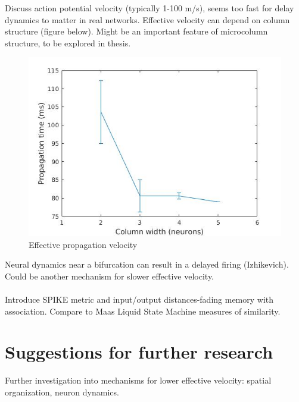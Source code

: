 \documentclass[a4paper,11pt]{article}
\numberwithin{equation}{section}
\begin{document}
Discuss action potential velocity (typically 1-100 m/s), seems too fast for delay dynamics to matter in real networks.
Effective velocity can depend on column structure (figure below). 
Might be an important feature of microcolumn structure, to be explored in thesis.
\\
\begin{figure}
 \caption{Effective propagation velocity}
 \centering
   \includegraphics[width=\textwidth]{fig/propagation_time}
\end{figure}
Neural dynamics near a bifurcation can result in a delayed firing (Izhikevich).
Could be another mechanism for slower effective velocity.
\\ \\
Introduce SPIKE metric and input/output distances-fading memory with association.
Compare to Maas Liquid State Machine measures of similarity.
\\
\section{Suggestions for further research}
Further investigation into mechanisms for lower effective velocity: spatial organization, neuron dynamics.\\
\end{document}
